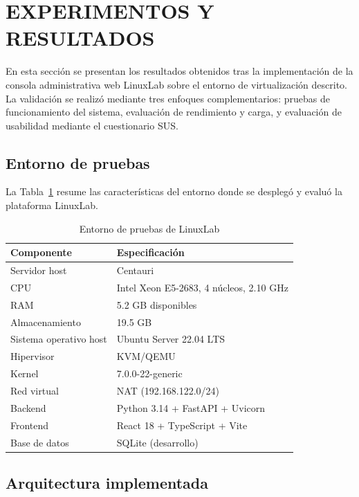 \section{EXPERIMENTOS Y RESULTADOS}
\label{sec:resultados}

En esta sección se presentan los resultados obtenidos tras la implementación de la
consola administrativa web LinuxLab sobre el entorno de virtualización descrito.
La validación se realizó mediante tres enfoques complementarios: pruebas de
funcionamiento del sistema, evaluación de rendimiento y carga, y evaluación de
usabilidad mediante el cuestionario SUS.

\subsection{Entorno de pruebas}

La Tabla~\ref{tab:test_environment} resume las características del entorno donde
se desplegó y evaluó la plataforma LinuxLab.

\begin{table}[htbp]
\caption{Entorno de pruebas de LinuxLab}
\label{tab:test_environment}
\centering
\footnotesize
\begin{tabular}{p{3.5cm} p{4.5cm}}
\toprule
\textbf{Componente} & \textbf{Especificación} \\
\midrule
Servidor host & Centauri \\
CPU & Intel Xeon E5-2683, 4 núcleos, 2.10 GHz \\
RAM & 5.2 GB disponibles \\
Almacenamiento & 19.5 GB \\
Sistema operativo host & Ubuntu Server 22.04 LTS \\
Hipervisor & KVM/QEMU \\
Kernel & 7.0.0-22-generic \\
Red virtual & NAT (192.168.122.0/24) \\
Backend & Python 3.14 + FastAPI + Uvicorn \\
Frontend & React 18 + TypeScript + Vite \\
Base de datos & SQLite (desarrollo) \\
\bottomrule
\end{tabular}
\end{table}

\subsection{Arquitectura implementada}

